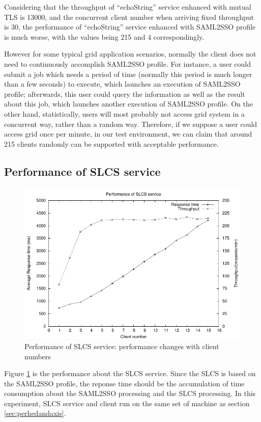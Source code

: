 \documentclass[conference]{IEEEtran}
\begin{document}
Considering that the throughput of ``echoString'' service enhanced with mutual TLS is 13000, and 
the concurrent client number when arriving fixed throughput is 30, the performance of
``echoString'' service enhanced with SAML2SSO profile is much worse, with the values being 215
and 4 correspondingly.

However for some typical grid application scenarios, normally the client does not need 
to continuously accomplish SAML2SSO profile. For instance, a user could submit a job 
which needs a period of time (normally this period is much longer than a few seconds)
to execute, which launches an execution of SAML2SSO profile; 
afterwards, this user could query the information as well as the result about this job, which 
launches another execution of SAML2SSO profile. On the other hand, statistically, users will most
probably not access grid system in a concurrent way, rather than a random way. Therefore, if we 
suppose a user could access grid once per minute, in our test environment, we can claim that 
around 215 clients randomly can be supported with acceptable performance.

\subsection{Performance of SLCS service}
\label{sec:perfslcsserv}

\begin{figure}
\includegraphics[width=0.9\columnwidth]{SLCS_thread_all.pdf}
\caption{Performance of SLCS service: performance changes with client numbers}
\label{fig:SLCS_thread_all}
\end{figure}

Figure \ref{fig:SLCS_thread_all} is the performance about the SLCS service. Since the SLCS is 
based on the SAML2SSO profile, the reponse time should be the accumulation of time consumption 
about the SAML2SSO processing and the SLCS processing. In this experiment, SLCS service and 
client run on the same set of machine as section \ref{sec:perhedandaxis}. 
\end{document}

